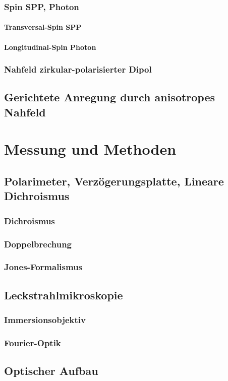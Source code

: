 \documentclass{article}
\begin{document}
	\subsubsection{Spin SPP, Photon}
		\paragraph{Transversal-Spin SPP}
		\paragraph{Longitudinal-Spin Photon}
	\subsubsection{Nahfeld zirkular-polarisierter Dipol}
	\subsection{Gerichtete Anregung durch anisotropes Nahfeld}	
\section{Messung und Methoden}
\subsection{Polarimeter, Verzögerungsplatte, Lineare Dichroismus}
	\subsubsection{Dichroismus}
	\subsubsection{Doppelbrechung}
	\subsubsection{Jones-Formalismus}
\subsection{Leckstrahlmikroskopie}
	\subsubsection{Immersionsobjektiv}
	\subsubsection{Fourier-Optik}
\subsection{Optischer Aufbau}
\end{document}
